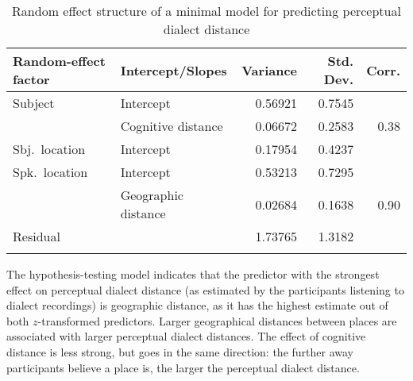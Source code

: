 \documentclass[output=paper,colorlinks,citecolor=brown,draft]{langscibook}
\begin{document}
\begin{table}
\caption{Random effect structure of a minimal model for predicting perceptual dialect distance}
\label{tab:res_min}
 \begin{tabular}{llrrr}
  \lsptoprule
    Random-effect factor & Intercept/Slopes & Variance & Std. Dev. & Corr.\\
  \midrule
    Subject	& Intercept	& 0.56921  & 0.7545 & \\  	
     & Cognitive distance & 0.06672 & 0.2583 & 0.38\\
    Sbj.~location & Intercept & 0.17954 & 0.4237 & \\	
    Spk.~location & Intercept & 0.53213 & 0.7295	& \\
     & Geographic distance & 0.02684 & 0.1638 & 0.90\\
     Residual & & 1.73765 & 1.3182 & \\
  \lspbottomrule
 \end{tabular}
\end{table}

The hypothesis-testing model indicates that the predictor with the strongest effect on perceptual dialect distance (as estimated by the participants listening to dialect recordings) is geographic distance, as it has the highest estimate out of both $z$-transformed predictors. Larger geographical distances between places are associated with larger perceptual dialect distances. The effect of cognitive distance is less strong, but goes in the same direction: the further away participants believe a place is, the larger the perceptual dialect distance. 
\end{document}
